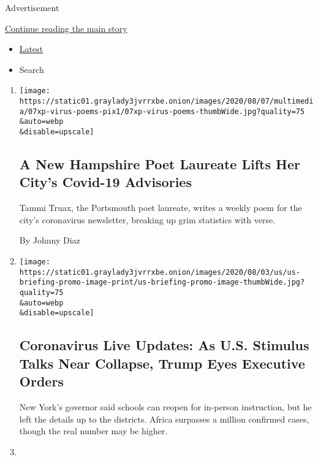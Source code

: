 Advertisement

\protect\hyperlink{after-mid2}{Continue reading the main story}

\begin{itemize}
\tightlist
\item
  \protect\hyperlink{stream-panel}{Latest}
\item
  Search
\end{itemize}

\begin{enumerate}
\def\labelenumi{\arabic{enumi}.}
\item
  \href{/2020/08/07/us/portsmouth-nh-newsletter-poems.html}{}

  \texttt{[image: https://static01.graylady3jvrrxbe.onion/images/2020/08/07/multimedia/07xp-virus-poems-pix1/07xp-virus-poems-thumbWide.jpg?quality=75\\\&auto=webp\\\&disable=upscale]}

  \hypertarget{a-new-hampshire-poet-laureate-lifts-her-citys-covid-19-advisories}{%
  \subsection{A New Hampshire Poet Laureate Lifts Her City's Covid-19
  Advisories}\label{a-new-hampshire-poet-laureate-lifts-her-citys-covid-19-advisories}}

  Tammi Truax, the Portsmouth poet laureate, writes a weekly poem for
  the city's coronavirus newsletter, breaking up grim statistics with
  verse.

  By Johnny Diaz
\item
  \href{/2020/08/07/world/covid-19-news.html}{}

  \texttt{[image: https://static01.graylady3jvrrxbe.onion/images/2020/08/03/us/us-briefing-promo-image-print/us-briefing-promo-image-thumbWide.jpg?quality=75\\\&auto=webp\\\&disable=upscale]}

  \hypertarget{coronavirus-live-updates-as-us-stimulus-talks-near-collapse-trump-eyes-executive-orders}{%
  \subsection{Coronavirus Live Updates: As U.S. Stimulus Talks Near
  Collapse, Trump Eyes Executive
  Orders}\label{coronavirus-live-updates-as-us-stimulus-talks-near-collapse-trump-eyes-executive-orders}}

  New York's governor said schools can reopen for in-person instruction,
  but he left the details up to the districts. Africa surpasses a
  million confirmed cases, though the real number may be higher.
\item
  \href{/2020/08/06/health/coronavirus-immune-cells.html}{}


\end{enumerate}
